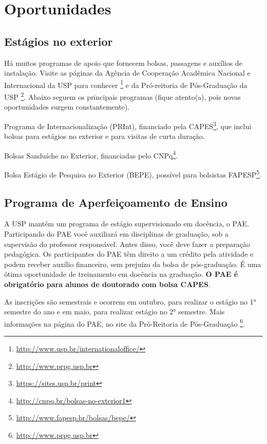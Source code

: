 \documentclass[twoside a4paper 12pt]{report}
\begin{document}
\chapter{Oportunidades}
\label{sec:oport}

\section{Estágios no exterior}
Há muitos programas de apoio que fornecem bolsas, passagens e auxílios de instalação. Visite as páginas da Agência de Cooperação Acadêmica Nacional e Internacional da USP para conhecer \footnote{\url{http://www.usp.br/internationaloffice/}} e da Pró-reitoria de Pós-Graduação da USP \footnote{\url{http://www.prpg.usp.br}}. Abaixo seguem os principais programas (fique atento(a), pois novas oportunidades surgem constantemente).
\begin{description}
\item Programa de Internacionalização (PRInt), financiado pela CAPES\footnote{\url{https://sites.usp.br/print}}, que inclui bolsas para estágios no exterior e para visitas de curta duração. 
\item Bolsas Sanduíche no Exterior, financiadas pelo CNPq\footnote{\url{http://cnpq.br/bolsas-no-exterior1}}. 
\item Bolsa Estágio de Pesquisa no Exterior (BEPE), possível para bolsistas FAPESP\footnote{\url{http://www.fapesp.br/bolsas/bepe/}}.
\end{description}

\section{Programa de Aperfeiçoamento de Ensino}
\label{subsec:pae}

A USP mantém um programa de estágio supervisionado em docência, o PAE. Participando do PAE você auxiliará em disciplinas de graduação, sob a supervisão do professor responsável.  Antes disso, você deve fazer a preparação pedagógica. Os participantes do PAE têm direito a um crédito pela atividade e podem receber auxílio financeiro, sem prejuízo da bolsa de pós-graduação. É uma ótima oportunidade de treinamento em docência na graduação. \textbf{O PAE é obrigatório para alunos de doutorado com bolsa CAPES}.

As inscrições são semestrais e ocorrem em outubro, para realizar o estágio no 1° semestre do ano e em maio, para realizar estágio no 2° semestre. Mais informações na página do PAE, no site da Pró-Reitoria de Pós-Graduação \footnote{\url{http://www.prpg.usp.br}}.
\end{document}
